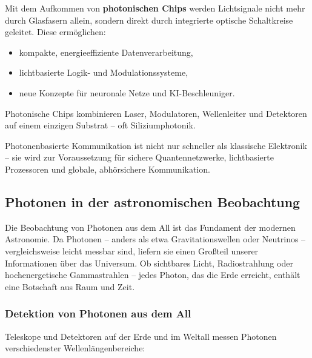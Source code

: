 Mit dem Aufkommen von \textbf{photonischen Chips} werden Lichtsignale nicht mehr durch Glasfasern allein, sondern direkt durch integrierte optische Schaltkreise geleitet. Diese ermöglichen:

\begin{itemize}
	\item kompakte, energieeffiziente Datenverarbeitung,
	\item lichtbasierte Logik- und Modulationssysteme,
	\item neue Konzepte für neuronale Netze und KI-Beschleuniger.
\end{itemize}

Photonische Chips kombinieren Laser, Modulatoren, Wellenleiter und Detektoren auf einem einzigen Substrat – oft Siliziumphotonik.

\begin{tcolorbox}[hinweisbox, title=Zukunft der photonischen Kommunikation] 
	\label{box:Zukunft Kommunikation}
	\small
	Photonenbasierte Kommunikation ist nicht nur schneller als klassische Elektronik – sie wird zur Voraussetzung für sichere Quantennetzwerke, lichtbasierte Prozessoren und globale, abhörsichere Kommunikation.
\end{tcolorbox}

\subsection{Photonen in der astronomischen Beobachtung}

Die Beobachtung von Photonen aus dem All ist das Fundament der modernen Astronomie. Da Photonen – anders als etwa Gravitationswellen oder Neutrinos – vergleichsweise leicht messbar sind, liefern sie einen Großteil unserer Informationen über das Universum. Ob sichtbares Licht, Radiostrahlung oder hochenergetische Gammastrahlen – jedes Photon, das die Erde erreicht, enthält eine Botschaft aus Raum und Zeit.

\subsubsection{Detektion von Photonen aus dem All}

Teleskope und Detektoren auf der Erde und im Weltall messen Photonen verschiedenster Wellenlängenbereiche:

